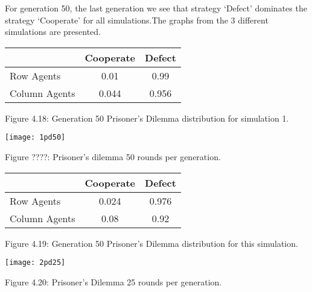 \documentclass{article}
\begin{document}
For generation 50, the last generation we see that strategy `Defect' dominates the strategy `Cooperate' for all simulations.The graphs from the 3 different simulations are presented.
\begin{center}
\begin{tabular}{|l|c|c|}
\hline
& Cooperate & Defect \\ 
\hline
Row Agents & 0.01 & 0.99\\
\hline
Column Agents & 0.044 & 0.956\\
\hline
\end{tabular}
\end{center}
\begin{center}
Figure 4.18: Generation 50 Prisoner’s Dilemma distribution for simulation 1.
\end{center}
\begin{center}
	\texttt{[image: 1pd50]}

Figure ????: Prisoner's dilemma 50 rounds per generation.
\end{center}

\begin{center}
\begin{tabular}{|l|c|c|}
\hline
& Cooperate & Defect \\ 
\hline
Row Agents & 0.024 & 0.976\\
\hline
Column Agents & 0.08 & 0.92\\
\hline
\end{tabular}
\end{center}
\begin{center}
Figure 4.19: Generation 50 Prisoner’s Dilemma distribution for this simulation.
\end{center}
\begin{center}
	\texttt{[image: 2pd25]}

Figure 4.20: Prisoner's Dilemma 25 rounds per generation.
\end{center}
\end{document}
